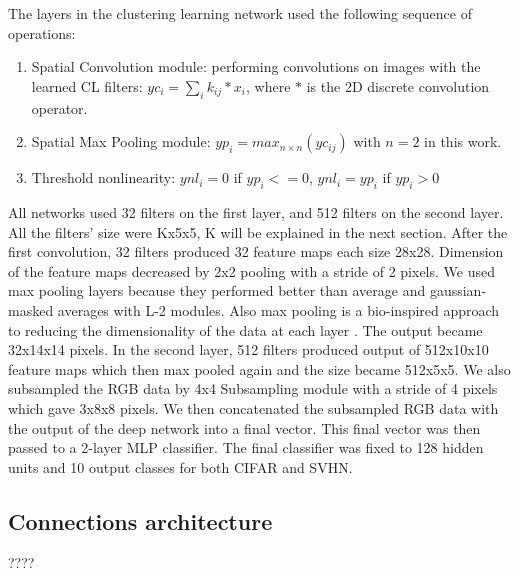 \documentclass{article} %
\begin{document}
The layers in the clustering learning network used the following sequence of operations:
\begin{enumerate}
\item Spatial Convolution module: performing convolutions on images with the learned CL filters: $yc_i=\sum_i{k_{ij}\ast x_i}$, where $\ast$ is the 2D discrete convolution operator.
\item Spatial Max Pooling module: $yp_i = max_{n \times n}(yc_{ij})$ with $n =  2$ in this work.
\item Threshold nonlinearity: $ynl_i = 0$ if $yp_i <= 0$, $ynl_i = yp_i$ if $yp_i > 0$
\end{enumerate}

All networks used 32 filters on the first layer, and 512 filters on the second layer. All the filters' size were Kx5x5, K will be explained in the next section. After the first convolution, 32 filters produced 32 feature maps each size 28x28. Dimension of the feature maps decreased by 2x2 pooling with a stride of 2 pixels. We used max pooling layers because they performed better than average and gaussian-masked averages with L-2 modules. Also max pooling is a bio-inspired approach to reducing the dimensionality of the data at each layer \cite{lampl2004intracellular}. The output became 32x14x14 pixels. In the second layer, 512 filters produced output of 512x10x10 feature maps which then max pooled again and the size became 512x5x5. 
We also subsampled the RGB data by 4x4 Subsampling module with a stride of 4 pixels which gave 3x8x8 pixels.  We then concatenated the subsampled RGB data with the output of the deep network into a final vector. This final vector was then passed to a 2-layer MLP classifier. The final classifier was fixed to 128 hidden units and 10 output classes for both CIFAR and SVHN.





\subsection{Connections architecture}
????

\end{document}
